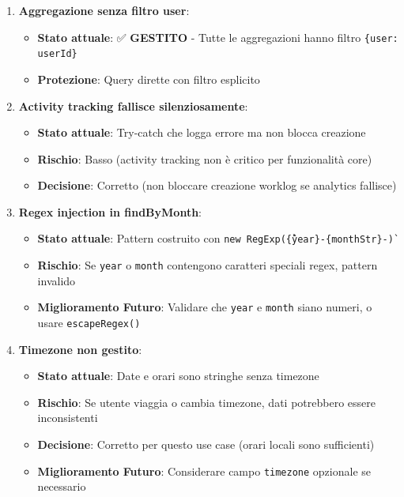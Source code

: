\documentclass[11pt,a4paper]{article}
\begin{document}
\begin{enumerate}
    \item \textbf{Aggregazione senza filtro user}:
    \begin{itemize}
        \item \textbf{Stato attuale}: ✅ \textbf{GESTITO} - Tutte le aggregazioni hanno filtro \texttt{\{user: userId\}}
        \item \textbf{Protezione}: Query dirette con filtro esplicito
    \end{itemize}
    
    \item \textbf{Activity tracking fallisce silenziosamente}:
    \begin{itemize}
        \item \textbf{Stato attuale}: Try-catch che logga errore ma non blocca creazione
        \item \textbf{Rischio}: Basso (activity tracking non è critico per funzionalità core)
        \item \textbf{Decisione}: Corretto (non bloccare creazione worklog se analytics fallisce)
    \end{itemize}
    
    \item \textbf{Regex injection in findByMonth}:
    \begin{itemize}
        \item \textbf{Stato attuale}: Pattern costruito con \texttt{new RegExp(\`\^\{year\}-\{monthStr\}-\`)}
        \item \textbf{Rischio}: Se \texttt{year} o \texttt{month} contengono caratteri speciali regex, pattern invalido
        \item \textbf{Miglioramento Futuro}: Validare che \texttt{year} e \texttt{month} siano numeri, o usare \texttt{escapeRegex()}
    \end{itemize}
    
    \item \textbf{Timezone non gestito}:
    \begin{itemize}
        \item \textbf{Stato attuale}: Date e orari sono stringhe senza timezone
        \item \textbf{Rischio}: Se utente viaggia o cambia timezone, dati potrebbero essere inconsistenti
        \item \textbf{Decisione}: Corretto per questo use case (orari locali sono sufficienti)
        \item \textbf{Miglioramento Futuro}: Considerare campo \texttt{timezone} opzionale se necessario
    \end{itemize}
\end{enumerate}
\end{document}
